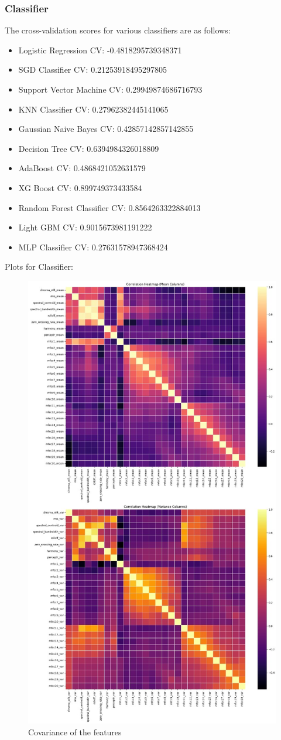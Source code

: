 \documentclass[a4paper, 24pt]{article}
\begin{document}
\subsubsection{Classifier}
The cross-validation scores for various classifiers are as follows:
\begin{itemize}
    \item Logistic Regression CV: -0.4818295739348371
    \item SGD Classifier CV: 0.21253918495297805
    \item Support Vector Machine CV: 0.29949874686716793
    \item KNN Classifier CV: 0.27962382445141065
    \item Gaussian Naive Bayes CV: 0.42857142857142855
    \item Decision Tree CV: 0.6394984326018809
    \item AdaBoost CV: 0.4868421052631579
    \item XG Boost CV: 0.899749373433584
    \item Random Forest Classifier CV: 0.8564263322884013
    \item Light GBM CV: 0.9015673981191222
    \item MLP Classifier CV: 0.27631578947368424
\end{itemize}
Plots for Classifier:
\begin{figure}[H]
    \centering
    \includegraphics[width=0.5\linewidth]{WhatsApp Image 2024-04-21 at 02.52.30_54356434.jpg}
    \caption{Covariance of the features}
    \label{fig:cov_fea_class}
\end{figure}
\end{document}

